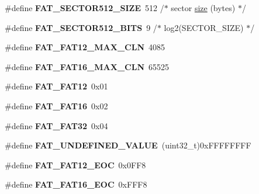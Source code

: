 \begin{DoxyCompactItemize}
\#define {\bfseries F\+A\+T\+\_\+\+S\+E\+C\+T\+O\+R512\+\_\+\+S\+I\+ZE}~512 /$\ast$ sector \mbox{\hyperlink{sun4u_2tte_8h_a245260f6f74972558f61b85227df5aae}{size}} (bytes) $\ast$/
\item 
\mbox{\label{group__libfs__dosfs_ga2bce9b40afd79972b83ddf109d6fff11}} 
\#define {\bfseries F\+A\+T\+\_\+\+S\+E\+C\+T\+O\+R512\+\_\+\+B\+I\+TS}~9 /$\ast$ log2(S\+E\+C\+T\+O\+R\+\_\+\+S\+I\+ZE) $\ast$/
\item 
\mbox{\label{group__libfs__dosfs_gafd6306ac9e83d58956b396864203730a}} 
\#define {\bfseries F\+A\+T\+\_\+\+F\+A\+T12\+\_\+\+M\+A\+X\+\_\+\+C\+LN}~4085
\item 
\mbox{\label{group__libfs__dosfs_ga96b2a2f4dd14491925f264c1caf82297}} 
\#define {\bfseries F\+A\+T\+\_\+\+F\+A\+T16\+\_\+\+M\+A\+X\+\_\+\+C\+LN}~65525
\item 
\mbox{\label{group__libfs__dosfs_ga80efde762abb9e87baebbaf12f5657d1}} 
\#define {\bfseries F\+A\+T\+\_\+\+F\+A\+T12}~0x01
\item 
\mbox{\label{group__libfs__dosfs_ga6ba0116017ef2f79ffeaa9491ea8b8f1}} 
\#define {\bfseries F\+A\+T\+\_\+\+F\+A\+T16}~0x02
\item 
\mbox{\label{group__libfs__dosfs_ga38016c050f179b4470d8edd144c52582}} 
\#define {\bfseries F\+A\+T\+\_\+\+F\+A\+T32}~0x04
\item 
\mbox{\label{group__libfs__dosfs_gaf8a24255ed2d6b97315dad0dd396578c}} 
\#define {\bfseries F\+A\+T\+\_\+\+U\+N\+D\+E\+F\+I\+N\+E\+D\+\_\+\+V\+A\+L\+UE}~(uint32\+\_\+t)0x\+F\+F\+F\+F\+F\+F\+FF
\item 
\mbox{\label{group__libfs__dosfs_gaf62680c6724dc3813dda78a23d42853d}} 
\#define {\bfseries F\+A\+T\+\_\+\+F\+A\+T12\+\_\+\+E\+OC}~0x0\+F\+F8
\item 
\mbox{\label{group__libfs__dosfs_ga2b9be963d679ae409b49c3944c5a9dc2}} 
\#define {\bfseries F\+A\+T\+\_\+\+F\+A\+T16\+\_\+\+E\+OC}~0x\+F\+F\+F8
\item 

\end{DoxyCompactItemize}
